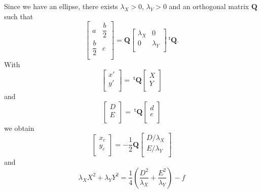 \documentclass[aps]{revtex4}
\newcommand{\mymat}[1]{\boldsymbol{#1}}
\newcommand{\mytrn}[1]{~^{\mathsf{t}}\!{#1}}
\begin{document}
Since we have an ellipse, there exists $\lambda_X>0$, $\lambda_Y>0$ and an orthogonal matrix $\mymat{Q}$ such that
\begin{equation}
\begin{bmatrix}
 a & \dfrac{b}{2} \\
 \dfrac{b}{2} & c\\
\end{bmatrix}
= \mymat{Q}
\begin{bmatrix}
	\lambda_X & 0 \\
	0  & \lambda_Y \\
\end{bmatrix}
\mytrn{\mymat{Q}}.
\end{equation}
With 
\begin{equation}
	\begin{bmatrix}
	x'\\
	y'\\
	\end{bmatrix}
	=
	\mytrn{\mymat{Q}}
	\begin{bmatrix}
	X\\
	Y\\
	\end{bmatrix}
\end{equation}
and
\begin{equation}
	\begin{bmatrix}
	D \\
	E \\
	\end{bmatrix}
	=
	\mytrn{\mymat{Q}}
	\begin{bmatrix}
	d\\
	e\\
	\end{bmatrix}
\end{equation}
we obtain
\begin{equation}
	\begin{bmatrix}
	x_c\\
	y_c\\
	\end{bmatrix}
	= -\dfrac{1}{2}\mymat{Q}
	\begin{bmatrix}
	D / \lambda_X\\
	E / \lambda_Y\\
	\end{bmatrix}
\end{equation}
and
\begin{equation}
	\lambda_X X^2 + \lambda_Y Y^2 = \dfrac{1}{4}\left(\dfrac{D^2}{\lambda_X} + \dfrac{E^2}{\lambda_Y}\right) - f
\end{equation}
\end{document}
